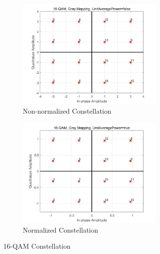 \documentclass{article}
\begin{document}
\begin{figure}[!ht]
	\centering
	\begin{subfigure}{0.5\textwidth}
		\centerline{\includegraphics[width=0.8\textwidth]{16qamnonunit.jpg}}
		\caption{Non-normalized Constellation}
	\end{subfigure}%
	\begin{subfigure}{0.5\textwidth}
		\centerline{\includegraphics[width=0.8\textwidth]{16qamunit.jpg}}
		\caption{Normalized Constellation}
	\end{subfigure}
	\caption{16-QAM Constellation}
\end{figure}
\\
\end{document}
